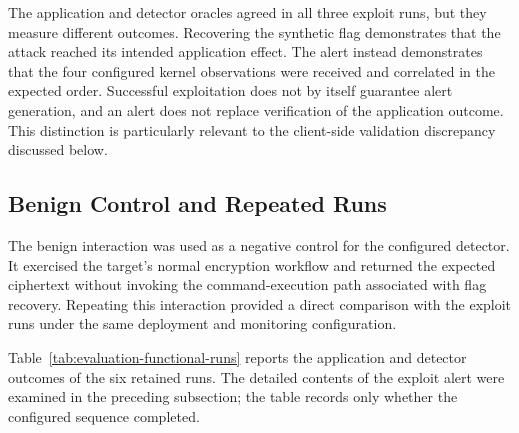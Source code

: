 The application and detector oracles agreed in all three exploit runs, but they
measure different outcomes. Recovering the synthetic flag demonstrates that the
attack reached its intended application effect. The alert instead demonstrates
that the four configured kernel observations were received and correlated in
the expected order. Successful exploitation does not by itself guarantee alert
generation, and an alert does not replace verification of the application
outcome. This distinction is particularly relevant to the client-side
validation discrepancy discussed below.

\subsection{Benign Control and Repeated Runs}
\label{subsec:evaluation-benign-repeated-runs}

The benign interaction was used as a negative control for the configured
detector. It exercised the target's normal encryption workflow and returned the
expected ciphertext without invoking the command-execution path associated with
flag recovery. Repeating this interaction provided a direct comparison with
the exploit runs under the same deployment and monitoring configuration.

Table~\ref{tab:evaluation-functional-runs} reports the application and detector
outcomes of the six retained runs. The detailed contents of the exploit alert
were examined in the preceding subsection; the table records only whether the
configured sequence completed.

